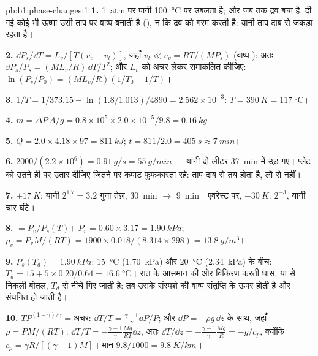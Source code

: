 \begin{solution}{pb:b1:phase-changes:1}
\textbf{1.} \qty{1}{atm} पर पानी \qty{100}{\degreeCelsius} पर उबलता है; और जब
तक द्रव बचा है, दी गई कोई भी ऊष्मा उसी ताप पर वाष्प बनाती है (),
न कि द्रव को गरम करती है: यानी ताप दाब से जकड़ा रहता है।

\textbf{2.} $\dd P_s/\dd T = L_v/[T(v_v - v_l)]$, जहाँ $v_l \ll v_v = RT/(MP_s)$
(वाष्प ): अतः $\dd P_s/P_s = (ML_v/R)\,\dd T/T^2$; और $L_v$ को अचर
लेकर समाकलित कीजिए: $\ln(P_s/P_0) = (ML_v/R)(1/T_0 - 1/T)$।

\textbf{3.} $1/T = 1/373.15 - \ln(1.8/1.013)/4890 = 2.562 \times 10^{-3}$: $T =
\qty{390}{K} = \qty{117}{\degreeCelsius}$।

\textbf{4.} $m = \Delta P\,A/g = 0.8 \times 10^5 \times 2.0 \times 10^{-5}/9.8 =
\qty{0.16}{kg}$।

\textbf{5.} $Q = 2.0 \times 4.18 \times 97 = \qty{811}{kJ}$; $t = 811/2.0 =
\qty{405}{s} \approx \qty{7}{min}$।

\textbf{6.} $2000/(2.2 \times 10^6) = \qty{0.91}{g/s} = \qty{55}{g/min}$ --- यानी
दो लीटर \qty{37}{min} में उड़ गए। प्लेट को उतने ही पर उतार दीजिए जितने पर
कपाट फुफकारता रहे: ताप दाब से तय होता है, लौ से नहीं।

\textbf{7.} $+\qty{17}{K}$: यानी $2^{1.7} = 3.2$ गुना तेज़, \qty{30}{min}
$\to$ \qty{9}{min}। एवरेस्ट पर, $-\qty{30}{K}$: $2^{-3}$, यानी चार घंटे।

\textbf{8.}  $= P_v/P_s(T)$। $P_v = 0.60 \times 3.17 =
\qty{1.90}{kPa}$; $\rho_v = P_vM/(RT) = 1900 \times 0.018/(8.314 \times 298) =
\qty{13.8}{g/m^3}$।

\textbf{9.} $P_s(T_d) = \qty{1.90}{kPa}$: \qty{15}{\degreeCelsius}
(\qty{1.70}{kPa}) और \qty{20}{\degreeCelsius} (\qty{2.34}{kPa}) के बीच: $T_d = 15 + 5 \times 0.20/0.64
= \qty{16.6}{\degreeCelsius}$। रात के आसमान की ओर विकिरण करती घास, या
 से निकली बोतल, $T_d$ से नीचे गिर जाती है: तब उसके संस्पर्श की वाष्प
संतृप्ति के ऊपर होती है और संघनित हो जाती है।

\textbf{10.} $TP^{(1-\gamma)/\gamma} = \text{अचर}$: $\dd T/T = \frac{\gamma - 1}{\gamma}
\dd P/P$; और $\dd P = -\rho g\,\dd z$ के साथ, जहाँ $\rho = PM/(RT)$: $\dd T/T = -\frac{\gamma -
1}{\gamma}\frac{Mg}{RT}\dd z$, अतः $\dd T/\dd z = -\frac{\gamma - 1}{\gamma}\frac{Mg}{R} =
-g/c_p$, क्योंकि $c_p = \gamma R/[(\gamma - 1)M]$। मान $9.8/1000 = \qty{9.8}{K/km}$।


\end{solution}

